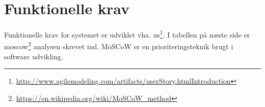 \section{Funktionelle krav}\label{FunkKrav}
Funktionelle krav for systemet er udviklet vha. \gls{us}\footnote{\url{http://www.agilemodeling.com/artifacts/userStory.htmlIntroduction}}.
I tabellen på næste side er \gls{moscow}\footnote{\url{https://en.wikipedia.org/wiki/MoSCoW_method}} analysen skrevet ind. MoSCoW er en prioriteringsteknik brugt i software udvikling.


%